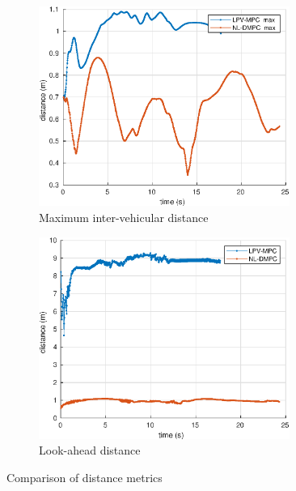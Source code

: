 \documentclass[a4paper,fleqn]{cas-sc}
\begin{document}
\begin{figure}[h]
\begin{subfigure}[b]{0.5\textwidth}
          \includegraphics[width=0.9\textwidth]{figs/experiments/d_ma.eps}
          \caption{Maximum inter-vehicular distance}
          \label{fig:figPlane}
        \end{subfigure}%
        \begin{subfigure}[b]{.5\textwidth}
          \centering
          \includegraphics[width=0.9\textwidth]{figs/experiments/la_avg.eps}
          \caption{Look-ahead distance}
          \label{fig:figEuclidean}
        \end{subfigure}
    \caption{Comparison of distance metrics}
    \label{fig:Dcomp}
\end{figure}
\end{document}
